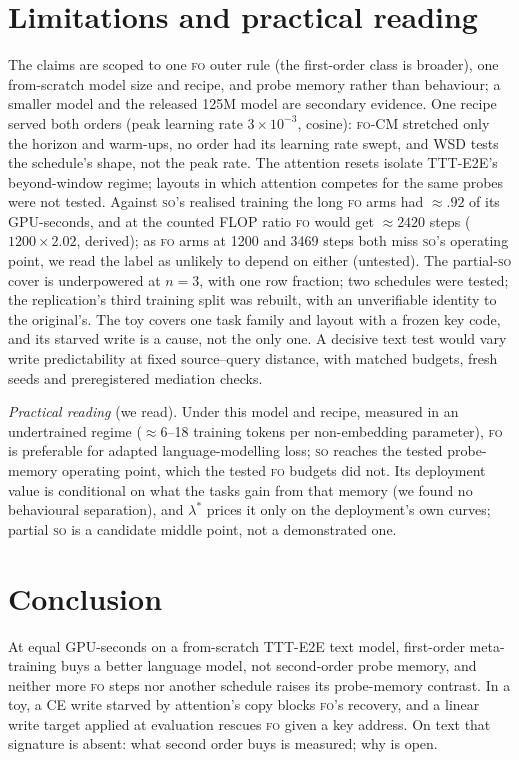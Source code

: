 \documentclass[11pt]{article}
\newcommand{\FO}{\textsc{fo}}
\newcommand{\SO}{\textsc{so}}
\newcommand{\lam}{\ensuremath{\lambda^{\ast}}}
\begin{document}
\section{Limitations and practical reading}
\label{sec:limits}

The claims are scoped to one \FO{} outer rule (the first-order class is broader), one from-scratch
model size and recipe, and probe memory rather than behaviour; a smaller model and the released 125M
model are secondary evidence. One recipe served both orders (peak learning rate $3\times10^{-3}$,
cosine): \FO-CM{} stretched only the horizon and warm-ups, no order had its learning rate swept, and
WSD tests the schedule's shape, not the peak rate. The attention resets isolate TTT-E2E's
beyond-window regime; layouts in which attention competes for the same probes were not tested.
Against \SO's realised training the long \FO{} arms had $\approx.92$ of its GPU-seconds, and at the
counted FLOP ratio \FO{} would get $\approx2420$ steps ($1200\times2.02$, derived); as \FO{} arms at
1200 and 3469 steps both miss \SO's operating point, we read the label as unlikely to depend on either
(untested).
The partial-\SO{} cover is underpowered at $n=3$, with one row fraction; two schedules were tested;
the replication's third training split was rebuilt, with an unverifiable identity to the original's.
The toy covers one task family and layout with a frozen key code, and its
starved write is a cause, not the only one. A decisive text test would vary write predictability at
fixed source--query distance, with matched budgets, fresh seeds and preregistered mediation checks.

\emph{Practical reading} (we read). Under this model and recipe, measured in an undertrained regime
($\approx$6--18 training tokens per non-embedding parameter), \FO{} is preferable for adapted
language-modelling loss; \SO{} reaches the tested probe-memory operating point, which the tested \FO{}
budgets did not. Its deployment value is conditional on what the tasks gain from that memory (we
found no behavioural separation), and $\lam$ prices it only on the deployment's own curves; partial
\SO{} is a candidate middle point, not a demonstrated one.

\section{Conclusion}
\label{sec:conclusion}

At equal GPU-seconds on a from-scratch TTT-E2E text model, first-order meta-training buys a
better language model, not second-order probe memory, and neither more \FO{} steps nor another
schedule raises its probe-memory contrast. In a toy, a CE write starved by attention's copy blocks \FO's recovery,
and a linear write target applied at evaluation rescues \FO{} given a key address. On text that signature is
absent: what second order buys is measured; why is open.
\end{document}
